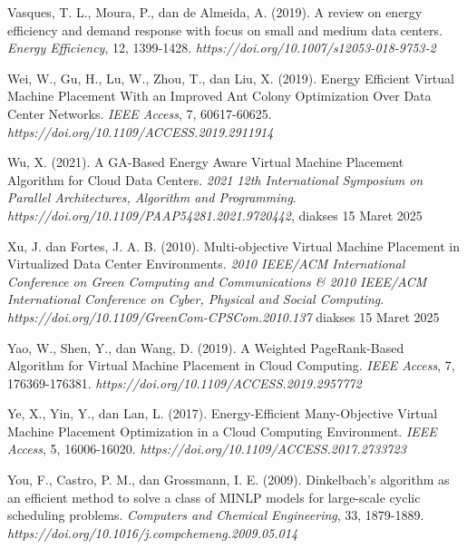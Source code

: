 \begin{thebibliography}{99}
	

	Vasques, T. L., Moura, P., dan de Almeida, A. (2019). A review on energy efficiency and demand response with focus on small and medium data centers. \textit{Energy Efficiency}, 12, 1399-1428. \textit{https://doi.org/10.1007/s12053-018-9753-2}
		
	

	Wei, W., Gu, H., Lu, W., Zhou, T., dan Liu, X. (2019). Energy Efficient Virtual Machine Placement With an Improved Ant Colony Optimization Over Data Center Networks. \textit{IEEE Access}, 7, 60617-60625. \textit{https://doi.org/10.1109/ACCESS.2019.2911914} 
	
	

	Wu, X. (2021). A GA-Based Energy Aware Virtual Machine Placement Algorithm for Cloud Data Centers. \textit{2021 12th International Symposium on Parallel Architectures, Algorithm and Programming}. \textit{https://doi.org/10.1109/PAAP54281.2021.9720442}, diakses 15 Maret 2025
	
	

	Xu, J. dan Fortes, J. A. B. (2010). Multi-objective Virtual Machine Placement in Virtualized Data Center Environments. \textit{2010 IEEE/ACM International Conference on Green Computing and Communications & 2010 IEEE/ACM International Conference on Cyber, Physical and Social Computing}. \textit{https://doi.org/10.1109/GreenCom-CPSCom.2010.137} diakses 15 Maret 2025
	
	

	Yao, W., Shen, Y., dan Wang, D. (2019). A Weighted PageRank-Based Algorithm for Virtual Machine Placement in Cloud Computing. \textit{IEEE Access}, 7, 176369-176381. \textit{https://doi.org/10.1109/ACCESS.2019.2957772}
	
	
  
	Ye, X., Yin, Y., dan Lan, L. (2017). Energy-Efficient Many-Objective Virtual Machine Placement Optimization in a Cloud Computing Environment. \textit{IEEE Access}, 5, 16006-16020. \textit{https://doi.org/10.1109/ACCESS.2017.2733723}
	
	

	You, F., Castro, P. M., dan Grossmann, I. E. (2009). Dinkelbach’s algorithm as an efficient method to solve a class of MINLP models for large-scale cyclic scheduling problems. \textit{Computers and Chemical Engineering}, 33, 1879-1889. \textit{https://doi.org/10.1016/j.compchemeng.2009.05.014}
	

\end{thebibliography}
